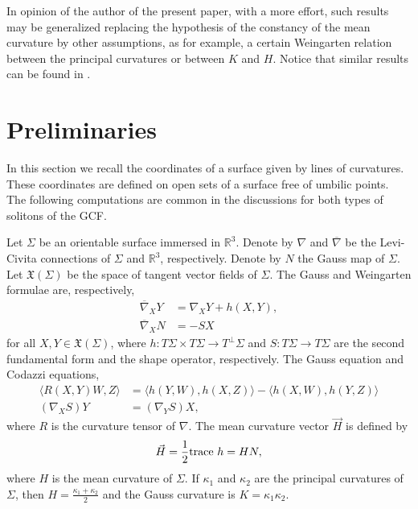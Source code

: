 \documentclass[a4paper,12pt]{amsart}
\theoremstyle{definition}
\def\r{\mathbb R}
\begin{document}
In opinion of the author of the present paper, with a  more effort, such results may be generalized replacing the hypothesis of the constancy of the mean curvature by other assumptions, as for example, a certain Weingarten relation between the principal curvatures or between $K$ and $H$. Notice that similar results can be found in \cite{fl,flly,fu2}. 

\section{Preliminaries}\label{s2}

In this section we recall the coordinates of a surface given by lines of curvatures. These coordinates are defined on open sets of a surface free of umbilic points. The following computations are common in the discussions for both types of solitons of the GCF. 

Let $\Sigma$ be an orientable surface immersed in $\r^3$. Denote by  $\nabla$ and $\overline{\nabla}$ be the Levi-Civita connections of $\Sigma$ and
$\mathbb{R}^3$, respectively.  Denote by $N$ the Gauss map of $\Sigma$. Let $\mathfrak{X}(\Sigma)$ be the space of tangent vector fields of $\Sigma$. The  Gauss and Weingarten formulae are, respectively, 
\begin{equation*}  
\begin{split}
    \overline{\nabla}_XY&=\nabla_XY+h(X,Y), \\
    \overline{\nabla}_XN&=-SX
    \end{split}
\end{equation*}
for all $X,Y\in\mathfrak{X}(\Sigma)$, where $h\colon T\Sigma\times T\Sigma\to T^\perp\Sigma$ and  $S\colon T\Sigma\to  T\Sigma$ are the second fundamental form and the shape
operator, respectively. The  Gauss
equation and Codazzi equations,  
\begin{equation*}
\begin{split}
    \langle R(X,Y)W,Z\rangle&=\langle h(Y,W),h(X,Z)\rangle-\langle
    h(X,W),h(Y,Z)\rangle\\
    (\nabla_XS)Y&=(\nabla_YS)X,
    \end{split}
\end{equation*}
where $R$ is the curvature tensor of $\nabla$. The   mean curvature vector $\vec{H}$ is defined by
\[     \vec{H}=\frac12{\rm trace}\ h=HN,\]
where $H$ is the mean curvature of $\Sigma$. If $\kappa_1$ and $\kappa_2$ are the principal curvatures of $\Sigma$, then $H=\frac{\kappa_1+\kappa_2}{2}$ and the Gauss curvature is $K=\kappa_1\kappa_2$. 
\end{document}
